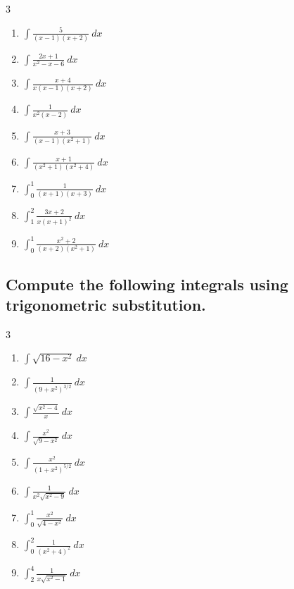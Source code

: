 \documentclass{article}
\begin{document}
\begin{multicols}{3}
\begin{enumerate}
\item $\displaystyle \int \frac{5}{(x-1)(x+2)}\ dx$
\item $\displaystyle \int \frac{2x+1}{x^2-x-6}\ dx$
\item $\displaystyle \int \frac{x+4}{x(x-1)(x+2)}\ dx$
\item $\displaystyle \int \frac{1}{x^2(x-2)}\ dx$
\item $\displaystyle \int \frac{x+3}{(x-1)(x^2+1)}\ dx$
\item $\displaystyle \int \frac{x+1}{(x^2+1)(x^2+4)}\ dx$
\item $\displaystyle \int_0^1 \frac{1}{(x+1)(x+3)}\ dx$
\item $\displaystyle \int_1^2 \frac{3x+2}{x(x+1)^2}\ dx$
\item $\displaystyle \int_0^1 \frac{x^2+2}{(x+2)(x^2+1)}\ dx$
\end{enumerate}
\end{multicols}

\subsection{Compute the following integrals using trigonometric substitution.}

\begin{multicols}{3}
\begin{enumerate}
\item $\displaystyle \int \sqrt{16-x^2}\ dx$
\item $\displaystyle \int \frac{1}{(9+x^2)^{3/2}}\ dx$
\item $\displaystyle \int \frac{\sqrt{x^2-4}}{x}\ dx$
\item $\displaystyle \int \frac{x^2}{\sqrt{9-x^2}}\ dx$
\item $\displaystyle \int \frac{x^2}{(1+x^2)^{5/2}}\ dx$
\item $\displaystyle \int \frac{1}{x^2\sqrt{x^2-9}}\ dx$
\item $\displaystyle \int_0^1 \frac{x^2}{\sqrt{4-x^2}}\ dx$
\item $\displaystyle \int_0^2 \frac{1}{(x^2+4)^2}\ dx$
\item $\displaystyle \int_2^4 \frac{1}{x\sqrt{x^2-1}}\ dx$
\end{enumerate}
\end{multicols}

\newpage
\end{document}
